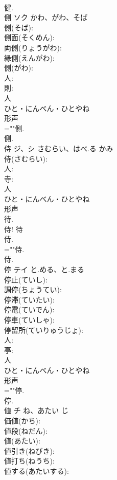 \documentclass[8pt]{extreport}
\begin{document}
\begin{CJK}{UTF8}{min}
\\	健.
\\	側	ソク	かわ、がわ、そば		
\\	側(そば): 
\\	側面(そくめん): 
\\	両側(りょうがわ): 
\\	縁側(えんがわ): 
\\	側(がわ): 
\\	人: 
\\	則: 
\\	人	
\\	ひと・にんべん・ひとやね	
\\	形声 
\\	=""側.
\\	側.
\\	侍	ジ、シ	さむらい、はべ.る	かみ	
\\	侍(さむらい): 
\\	人: 
\\	寺: 
\\	人	
\\	ひと・にんべん・ひとやね	
\\	形声 
\\	待. 
\\	侍! 待 
\\	侍.	
\\	=""侍.
\\	侍.
\\	停	テイ	と.める、と.まる		
\\	停止(ていし): 
\\	調停(ちょうてい): 
\\	停滞(ていたい): 
\\	停電(ていでん): 
\\	停車(ていしゃ): 
\\	停留所(ていりゅうじょ): 
\\	人: 
\\	亭: 
\\	人	
\\	ひと・にんべん・ひとやね	
\\	形声 
\\	=""停.
\\	停.
\\	値	チ	ね、あたい	じ	
\\	価値(かち): 
\\	値段(ねだん): 
\\	値(あたい): 
\\	値引き(ねびき): 
\\	値打ち(ねうち): 
\\	値する(あたいする): 

\end{CJK}
\end{document}

